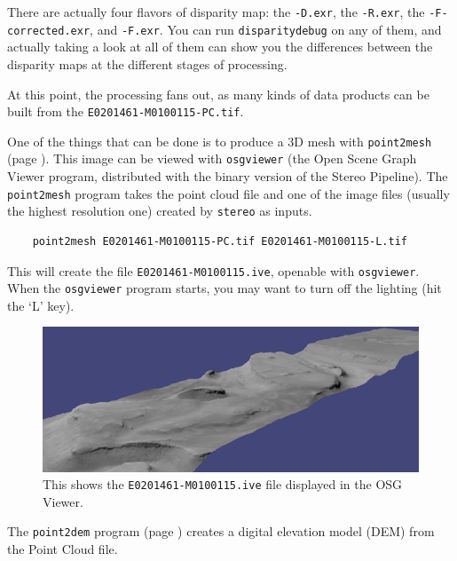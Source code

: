 There are actually four flavors of disparity map: the \texttt{-D.exr},
the \texttt{-R.exr}, the \texttt{-F-corrected.exr}, and \texttt{-F.exr}.
You can run \texttt{disparitydebug} on any of them, and actually taking a
look at all of them can show you the differences between the disparity maps
at the different stages of processing.

At this point, the processing fans out, as many kinds of data
products can be built from the \texttt{E0201461-M0100115-PC.tif}.

One of the things that can be done is to produce a 3D mesh with
\texttt{point2mesh} (page \pageref{point2mesh}).  This image can
be viewed with \texttt{osgviewer} (the Open Scene Graph Viewer
program, distributed with the binary version of the Stereo Pipeline).
The \texttt{point2mesh} program takes the point cloud file and one
of the image files (usually the highest resolution one) created by
\texttt{stereo} as inputs.

\begin{verbatim}
    point2mesh E0201461-M0100115-PC.tif E0201461-M0100115-L.tif
\end{verbatim}
\noindent
This will create the file \texttt{E0201461-M0100115.ive}, openable
with \texttt{osgviewer}. When the \texttt{osgviewer} program starts,
you may want to turn off the lighting (hit the `L' key).

\begin{figure}[h]
\begin{minipage}{5in}
\includegraphics[width=5in]{images/p19-osg.png}
\end{minipage}
\hfill
\begin{minipage}{1.7in}
\caption[P19 in OSG]{
    \label{p19-osg}
	This shows the \texttt{E0201461-M0100115.ive} file displayed in 
	the OSG Viewer.
    }
\end{minipage}
\end{figure}

The \texttt{point2dem} program (page \pageref{point2dem}) creates
a digital elevation model (DEM) from the Point Cloud file.

